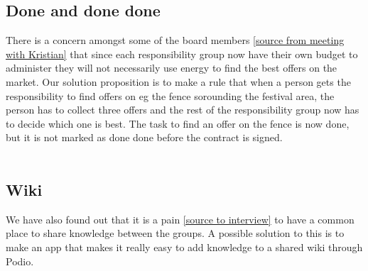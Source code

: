 \subsection{Done and done done}
There is a concern amongst some of the board members \ref{source from meeting
with Kristian} that since each responsibility group now have their own budget to
administer they will not necessarily use energy to find the best offers on the
market. Our solution proposition is to make a rule that when a person gets the
responsibility to find offers on eg the fence sorounding the festival area, the
person has to collect three offers and the rest of the responsibility group now
has to decide which one is best. The task to find an offer on the fence is now
done, but it is not marked as done done before the contract is signed.
\\
\\
\subsection{Wiki}
We have also found out that it is a pain \ref{source to interview} to have a
common place to share knowledge between the groups. A possible solution to this
is to make an app that makes it really easy to add knowledge to a shared wiki
through Podio.

